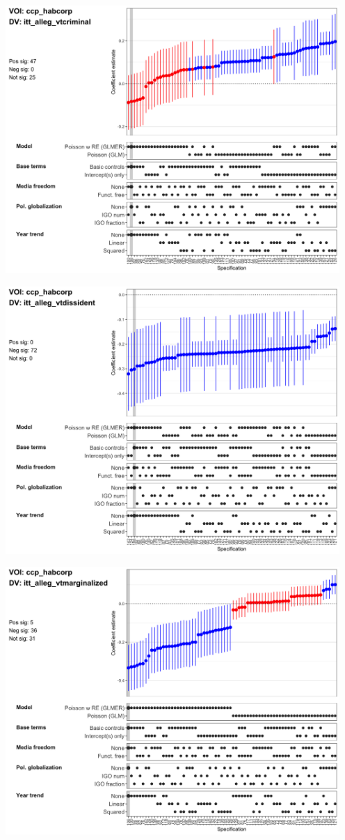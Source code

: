 \documentclass[]{article}
\begin{document}
\includegraphics[height=4in]{../output/figures-robustness/specplot-ccp_habcorp-itt_alleg_vtcriminal.png}

\includegraphics[height=4in]{../output/figures-robustness/specplot-ccp_habcorp-itt_alleg_vtdissident.png}

\includegraphics[height=4in]{../output/figures-robustness/specplot-ccp_habcorp-itt_alleg_vtmarginalized.png}
\end{document}
